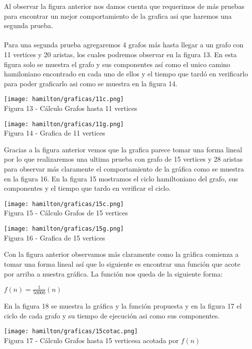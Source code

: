 \documentclass[12pt,twoside]{article}
\begin{document}
Al observar la figura anterior nos damos cuenta que requerimos de más pruebas para encontrar un mejor comportamiento de la grafica asi que haremos una segunda prueba.\\\\
Para una segunda prueba agregaremos 4 grafos más hasta llegar a un grafo con 11 vertices y 20 aristas, los cuales podremos observar en la figura 13. En esta figura solo se muestra el grafo y sus componentes así como el unico camino hamiloniano encontrado en cada uno de ellos y el tiempo que tardó en verificarlo para poder graficarlo asi como se muestra en la figura 14.
\begin{center}
    \texttt{[image: hamilton/graficas/11c.png]}\\
    Figura 13 - Cálculo Grafos hasta 11 vertices
\end{center}
\begin{center}
    \texttt{[image: hamilton/graficas/11g.png]}\\
    Figura 14 - Grafica de 11 vertices
\end{center}
Gracias a la figura anterior vemos que la grafica parece tomar una forma lineal por lo que realizaremos una ultima prueba con grafo de 15 vertices y 28 aristas para observar más claramente el comportamiento de la gráfica como se muestra en la figura 16. En la figura 15 mostramos el ciclo hamiltoniano del grafo, sus componentes y el tiempo que tardo en verificar el ciclo.
\begin{center}
    \texttt{[image: hamilton/graficas/15c.png]}\\
    Figura 15 - Cálculo Grafos de 15 vertices
\end{center}
\begin{center}
    \texttt{[image: hamilton/graficas/15g.png]}\\
    Figura 16 - Grafica de 15 vertices
\end{center}
Con la figura anterior observamos más claramente como la gráfica comienza a tomar una forma lineal así que lo siguiente es encontrar una función que acote por arriba a nuestra gráfica. La función nos queda de la siguiente forma:
\begin{center}
    $f(n) = \frac{1}{50000}(n)$
\end{center}
En la figura 18 se muestra la gráfica y la función propuesta y en la figura 17 el ciclo de cada grafo y su tiempo de ejecución asi como sus componentes.
\begin{center}
    \texttt{[image: hamilton/graficas/15cotac.png]}\\
    Figura 17 - Cálculo Grafos hasta 15 verticesa acotada por $f(n)$
\end{center}
\end{document}
